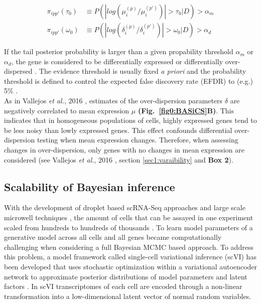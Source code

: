 \begin{align*}
\pi_{ipp'}(\tau_0)&\equiv{}P(|log(\mu_i^{(p)}/\mu_i^{(p')})|>\tau_0|D)>\alpha_m\\
\pi_{ipp'}(\omega_0)&\equiv{}P(|log(\delta_i^{(p)}/\delta_i^{(p')})|>\omega_0|D)>\alpha_d
\end{align*}

If the tail posterior probability is larger than a given propability threshold $\alpha_m$ or $\alpha_d$, the gene is considered to be differentially expressed or differentially over-dispersed \citep{Vallejos2016}. The evidence threshold is usually fixed \emph{a priori} and the probability threshold is defined to control the expected false discovery rate (EFDR) to (e.g.) 5\% \cite{Newton2004, Vallejos2016}.\\

As in Vallejos \emph{et al.}, 2016 \citep{Vallejos2016}, estimates of the over-dispersion parameters $\delta$ are negatively correlated to mean expression $\mu$ \textbf{(Fig.~\ref{fig0:BASiCS}B)}. This indicates that in homogeneous populations of cells, highly expressed genes tend to be less noisy than lowly expressed genes. This effect confounds differential over-dispersion testing when mean expression changes. Therefore, when assessing changes in over-dispersion, only genes with no changes in mean expression are considered (see Vallejos \emph{et al.}, 2016 \citep{Vallejos2016}, section \ref{sec1:varaibility} and \textbf{Box 2}).  

\subsection{Scalability of Bayesian inference}

With the development of droplet based scRNA-Seq approaches \citep{Macosko2015, Klein2015} and large scale microwell techniques \citep{Han2018}, the amount of cells that can be assayed in one experiment scaled from hundreds to hundreds of thousands \citep{Svensson2018}. To learn model parameters of a generative model across all cells and all genes became computationally challenging when considering a full Bayesian MCMC based approach. To address this problem, a model framework called single-cell variational inference (scVI) has been developed that uses stochastic optimization within a variational autoencoder network to approximate posterior distributions of model parameters and latent factors \citep{Lopez2018}. In scVI transcriptomes of each cell are encoded through a non-linear transformation into a low-dimensional latent vector of normal random variables. 

